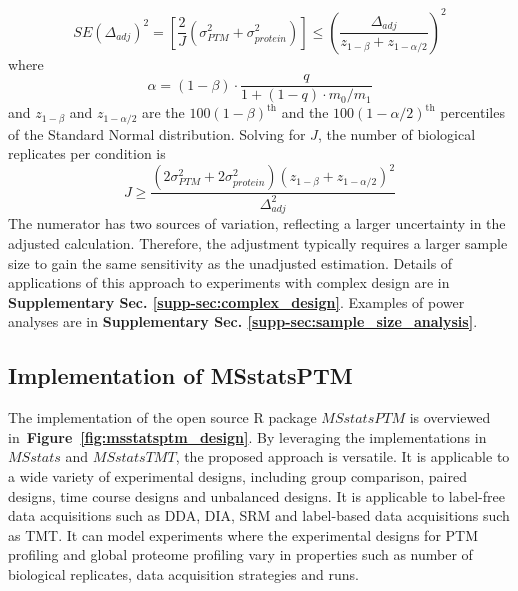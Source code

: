 \documentclass[mcp]{article}
\numberwithin{table}{section}
\def\figref#1{{\bf Figure~\ref{fig:#1}}}
\begin{document}
\begin{equation}
SE(\Delta_{adj})^2 = \left[ \frac{2}{J} \left( \sigma_{PTM}^{2} + \sigma_{protein}^{2} \right) \right]
\leq \left( \frac{\Delta_{adj}}{z_{1-\beta} + z_{1-\alpha /2}} \right)^{2}
\end{equation}
where 
\begin{equation}
\alpha = (1 - \beta) \cdot \frac{q}{1 + (1-q) \cdot m_0 / m_1}
\end{equation}
and $z_{1-\beta}$ and $z_{1-\alpha /2}$ are the $100(1-\beta)^{\text{th}}$ and the $100(1-\alpha /2)^{\text{th}}$ percentiles of the Standard Normal distribution.  Solving for $J$, the number of biological replicates per condition is
\begin{equation}
J \geq \frac{(2\sigma_{PTM}^{2} + 2\sigma_{protein}^{2})(z_{1-\beta} + z_{1-\alpha /2})^2}{\Delta_{adj}^2}
\end{equation}
The numerator has two sources of variation, reflecting a larger uncertainty in the adjusted calculation. Therefore, the adjustment typically requires a larger sample size to gain the same sensitivity as the unadjusted estimation. Details of applications of this approach to experiments with complex design are in {\bf Supplementary Sec. \ref{supp-sec:complex_design}}. Examples of power analyses are in {\bf Supplementary Sec. \ref{supp-sec:sample_size_analysis}}.

\subsection*{Implementation of MSstatsPTM}

The implementation of the open source R package $MSstatsPTM$ is overviewed in~\figref{msstatsptm_design}. By leveraging the implementations in $MSstats$ and $MSstatsTMT$, the proposed approach is versatile. It is applicable to a wide variety of experimental designs, including group comparison, paired designs, time course designs and unbalanced designs. It is applicable to label-free data acquisitions such as DDA, DIA, SRM and label-based data acquisitions such as TMT. It can model experiments where the experimental designs for PTM profiling and global proteome profiling vary in properties such as number of biological replicates, data acquisition strategies and runs. 
\end{document}
